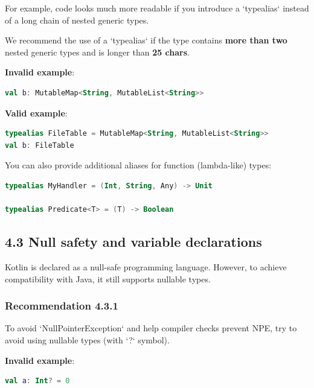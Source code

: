 {{{{For example, code looks much more readable if you introduce a `typealias` instead of a long chain of nested generic types.

We recommend the use of a `typealias` if the type contains \textbf{more than two} nested generic types and is longer than \textbf{25 chars}.



\textbf{Invalid example}:

\begin{lstlisting}[language=Kotlin]
val b: MutableMap<String, MutableList<String>>
\end{lstlisting}


\textbf{Valid example}:

\begin{lstlisting}[language=Kotlin]
typealias FileTable = MutableMap<String, MutableList<String>>
val b: FileTable
\end{lstlisting}


You can also provide additional aliases for function (lambda-like) types:

\begin{lstlisting}[language=Kotlin]
typealias MyHandler = (Int, String, Any) -> Unit

typealias Predicate<T> = (T) -> Boolean
\end{lstlisting}


\subsection*{\textbf{4.3 Null safety and variable declarations}}

Kotlin is declared as a null-safe programming language. However, to achieve compatibility with Java, it still supports nullable types.



\subsubsection*{\textbf{Recommendation 4.3.1}}
\leavevmode\newline

To avoid `NullPointerException` and help compiler checks prevent NPE, try to avoid using nullable types (with `?` symbol).



\textbf{Invalid example}:

\begin{lstlisting}[language=Kotlin]
val a: Int? = 0
\end{lstlisting}


}}}}
